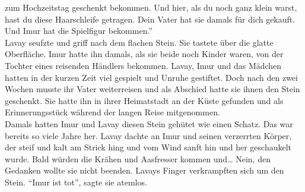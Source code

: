 zum Hochzeitstag geschenkt bekommen. Und hier, als du noch ganz klein warst, hast du diese 
Haarschleife getragen. Dein Vater hat sie damals für dich gekauft. Und Imur hat die Spielfigur 
bekommen.''\\
Lavay seufzte und griff nach dem flachen Stein. Sie tastete über die glatte Oberfläche. Imur hatte 
ihn damals, als sie beide noch Kinder waren, von der Tochter eines reisenden Händlers bekommen. 
Lavay, Imur und das Mädchen hatten in der kurzen Zeit viel gespielt und Unruhe gestiftet. Doch nach 
den zwei Wochen musste ihr Vater weiterreisen und als Abschied hatte sie ihnen den Stein geschenkt. 
Sie hatte ihn in ihrer Heimatstadt an der Küste gefunden und als Erinnerungsstück während der 
langen Reise mitgenommen.\\ 
Damals hatten Imur und Lavay diesen Stein gehütet wie einen Schatz. Das war bereits so viele Jahre 
her. Lavay dachte an Imur und seinen verzerrten Körper, der steif und kalt am Strick hing und vom 
Wind sanft hin und her geschaukelt wurde. Bald würden die Krähen und Aasfresser kommen und…
Nein, den Gedanken wollte sie nicht beenden. Lavays Finger verkrampften sich um den Stein.
``Imur ist tot'', sagte sie atemlos. \\

